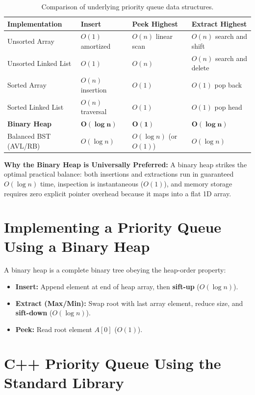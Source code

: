 \begin{table}[htbp]
\centering
\small
\begin{tabularx}{\textwidth}{l X X X}
\toprule
\textbf{Implementation} & \textbf{Insert} & \textbf{Peek Highest} & \textbf{Extract Highest} \\
\midrule
Unsorted Array          & $O(1)$ amortized & $O(n)$ linear scan    & $O(n)$ search and shift \\
Unsorted Linked List    & $O(1)$           & $O(n)$                & $O(n)$ search and delete \\
Sorted Array            & $O(n)$ insertion & $O(1)$                & $O(1)$ pop back \\
Sorted Linked List      & $O(n)$ traversal & $O(1)$                & $O(1)$ pop head \\
\textbf{Binary Heap}    & $\mathbf{O(\log n)}$ & $\mathbf{O(1)}$   & $\mathbf{O(\log n)}$ \\
Balanced BST (AVL/RB)   & $O(\log n)$      & $O(\log n)$ (or $O(1)$) & $O(\log n)$ \\
\bottomrule
\end{tabularx}
\caption{Comparison of underlying priority queue data structures.}
\end{table}

\textbf{Why the Binary Heap is Universally Preferred:}
A binary heap strikes the optimal practical balance: both insertions and extractions run in guaranteed $O(\log n)$ time, inspection is instantaneous ($O(1)$), and memory storage requires zero explicit pointer overhead because it maps into a flat 1D array.

\section{Implementing a Priority Queue Using a Binary Heap}

A binary heap is a complete binary tree obeying the heap-order property:
\begin{itemize}
    \item \textbf{Insert:} Append element at end of heap array, then \textbf{sift-up} ($O(\log n)$).
    \item \textbf{Extract (Max/Min):} Swap root with last array element, reduce size, and \textbf{sift-down} ($O(\log n)$).
    \item \textbf{Peek:} Read root element $A[0]$ ($O(1)$).
\end{itemize}

\section{C++ Priority Queue Using the Standard Library}

